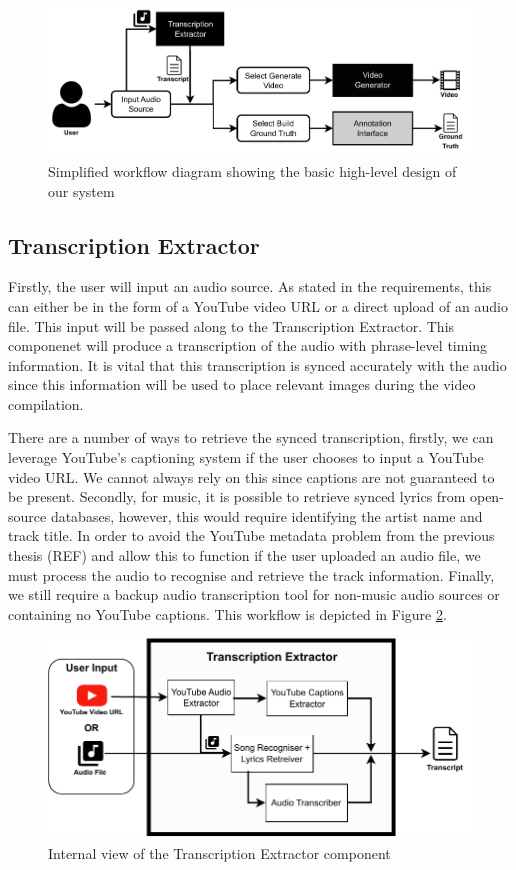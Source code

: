 \documentclass{l4proj}
\begin{document}
\begin{figure}[h]
    \centering
    \includegraphics[width=1\textwidth]{simplified_architecture.pdf}
    \caption{Simplified workflow diagram showing the basic high-level design of our system}
    \label{fig:simplified_workflow}
\end{figure}


\subsection{Transcription Extractor}
Firstly, the user will input an audio source. As stated in the requirements, this can either be in the form of a YouTube video URL or a direct upload of an audio file. This input will be passed along to the Transcription Extractor. This componenet will produce a transcription of the audio with phrase-level timing information. It is vital that this transcription is synced accurately with the audio since this information will be used to place relevant images during the video compilation.

There are a number of ways to retrieve the synced transcription, firstly, we can leverage YouTube's captioning system if the user chooses to input a YouTube video URL. We cannot always rely on this since captions are not guaranteed to be present. Secondly, for music, it is possible to retrieve synced lyrics from open-source databases, however, this would require identifying the artist name and track title. In order to avoid the YouTube metadata problem from the previous thesis (REF) and allow this to function if the user uploaded an audio file, we must process the audio to recognise and retrieve the track information. Finally, we still require a backup audio transcription tool for non-music audio sources or containing no YouTube captions. This workflow is depicted in Figure \ref{fig:transcription_extractor}.

\begin{figure}
    \centering
    \includegraphics[width=1\textwidth]{transcription_extractor.pdf}
    \caption{Internal view of the Transcription Extractor component}
    \label{fig:transcription_extractor}
\end{figure}
\end{document}
